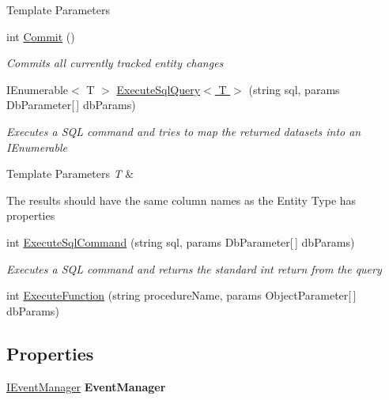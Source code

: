 \begin{DoxyCompactItemize}
\begin{DoxyCompactList}
\begin{DoxyTemplParams}{Template Parameters}
\end{DoxyTemplParams}
\end{DoxyCompactList}\item 
int \hyperlink{interface_framework_extension_1_1_core_1_1_interfaces_1_1_i_data_context_a50f3923131c6dbd2d5b057558327d9b2}{Commit} ()
\begin{DoxyCompactList}\small\item\em Commits all currently tracked entity changes \end{DoxyCompactList}\item 
I\-Enumerable$<$ T $>$ \hyperlink{interface_framework_extension_1_1_core_1_1_interfaces_1_1_i_data_context_ab2932a3d1a47a5efe2e26083724ed5a0}{Execute\-Sql\-Query$<$ T $>$} (string sql, params Db\-Parameter\mbox{[}$\,$\mbox{]} db\-Params)
\begin{DoxyCompactList}\small\item\em Executes a S\-Q\-L command and tries to map the returned datasets into an I\-Enumerable
\begin{DoxyTemplParams}{Template Parameters}
{\em T} & \\
\hline
\end{DoxyTemplParams}
The results should have the same column names as the Entity Type has properties \end{DoxyCompactList}\item 
int \hyperlink{interface_framework_extension_1_1_core_1_1_interfaces_1_1_i_data_context_a1deee0a581593b6ae859816fb9f243e2}{Execute\-Sql\-Command} (string sql, params Db\-Parameter\mbox{[}$\,$\mbox{]} db\-Params)
\begin{DoxyCompactList}\small\item\em Executes a S\-Q\-L command and returns the standard int return from the query \end{DoxyCompactList}\item 
int \hyperlink{interface_framework_extension_1_1_core_1_1_interfaces_1_1_i_data_context_a4fd23b695358dfafb3a2547fc78ce0ef}{Execute\-Function} (string procedure\-Name, params Object\-Parameter\mbox{[}$\,$\mbox{]} db\-Params)
\begin{DoxyCompactList}\small\item\em \end{DoxyCompactList}\end{DoxyCompactItemize}
\subsection*{Properties}
\begin{DoxyCompactItemize}
\item 
\hypertarget{interface_framework_extension_1_1_core_1_1_interfaces_1_1_i_data_context_ae8583e590f99c78c003f1ad9408b0fc8}{\hyperlink{interface_framework_extension_1_1_core_1_1_interfaces_1_1_i_event_manager}{I\-Event\-Manager} {\bfseries Event\-Manager}}\label{interface_framework_extension_1_1_core_1_1_interfaces_1_1_i_data_context_ae8583e590f99c78c003f1ad9408b0fc8}

\end{DoxyCompactItemize}


